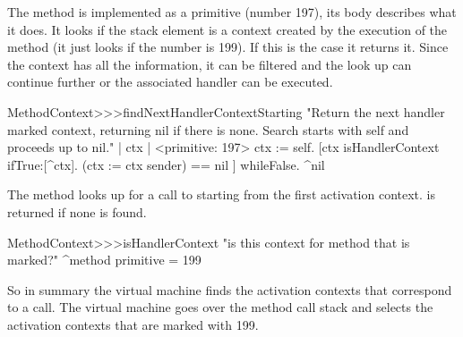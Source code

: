 \documentclass[a4paper,10pt,twoside]{book}
\begin{document}
The method  is implemented as a primitive (number 197), its body describes what it does. It looks 
if the stack element is a context created by the execution of the method  (it just looks if the number is 199). If this is  the case it returns it. Since the context has all the information, it can be filtered and the look up can continue further or the associated handler can be executed. 

\begin{code}{}
MethodContext>>>findNextHandlerContextStarting 
	"Return the next handler marked context, returning nil if there 
	is none. Search starts with self and proceeds up to nil." 
	| ctx |	
	<primitive: 197> 
	ctx := self. 
	[ctx isHandlerContext ifTrue:[^ctx]. 
	(ctx := ctx sender) == nil ] whileFalse. 
	^nil 
\end{code}

The method  looks up for a call to  starting from the first activation context.  is returned if none is found. 

\begin{code}{}
MethodContext>>>isHandlerContext 
	"is this context for method that is marked?" 
	^method primitive = 199 
\end{code}

So in summary the virtual machine finds the activation contexts that correspond to a  call. The virtual machine goes over the method call stack and selects the activation contexts that are marked with 199.





%

\end{document}
